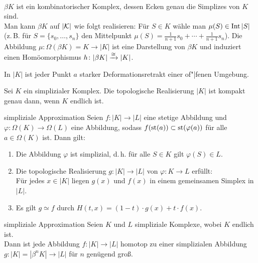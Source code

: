 \begin{Bem}\\
    $\beta K$ ist ein kombinatorischer Komplex, dessen Ecken genau die
    Simplizes von $K$ sind. \\
    Man kann $\beta K$ auf $|\mathcal{K}|$ wie folgt realisieren:
    Für $S \in K$ wähle man $\mu(S) \in \operatorname{Int} |S|$
    (z.\,B. für $S = \{s_0, \dotsc, s_n\}$ den Mittelpunkt
    $\mu(S) = \frac{1}{n + 1} s_0 + \dotsb + \frac{1}{n + 1} s_n$).
    Die Abbildung $\mu\colon \Omega(\beta K) = K \rightarrow |K|$ ist
    eine Darstellung von $\beta K$ und induziert einen Homöomorphismus
    $h\colon |\beta K| \xrightarrow{\cong} |K|$.
\end{Bem}

\begin{Kor}
    In $|K|$ ist jeder Punkt $a$ starker Deformationsretrakt einer of"|fenen
    Umgebung.
\end{Kor}

\begin{Kor}
    Sei $K$ ein simplizialer Komplex.
    Die topologische Realisierung $|K|$ ist kompakt genau dann, wenn
    $K$ endlich ist.
\end{Kor}

\linie

\begin{Lemma}{simpliziale Approximation}
    Seien $f\colon |K| \rightarrow |L|$ eine stetige Abbildung und \\
    $\varphi\colon \Omega(K) \rightarrow \Omega(L)$ eine Abbildung,
    sodass $f(\operatorname{st}(a)) \subset \operatorname{st}(\varphi(a))$ für alle $a \in \Omega(K)$ ist.
    Dann gilt:
    \begin{enumerate}
        \item
        Die Abbildung $\varphi$ ist simplizial, d.\,h.
        für alle $S \in K$ gilt $\varphi(S) \in L$.
        
        \item
        Die topologische Realisierung $g\colon |K| \rightarrow |L|$ von
        $\varphi\colon K \rightarrow L$ erfüllt: \\
        Für jedes $x \in |K|$ liegen $g(x)$ und $f(x)$ in einem gemeinsamen
        Simplex in $|L|$.
        
        \item
        Es gilt $g \simeq f$ durch
        $H(t, x) = (1 - t) \cdot g(x) + t \cdot f(x)$.
    \end{enumerate}
\end{Lemma}

\begin{Satz}{simpliziale Approximation}
    Seien $K$ und $L$ simpliziale Komplexe, wobei $K$ endlich ist. \\
    Dann ist jede Abbildung $f\colon |K| \rightarrow |L|$ homotop zu einer
    simplizialen Abbildung \\
    $g\colon |K| = |\beta^n K| \rightarrow |L|$ für $n$ genügend groß.
\end{Satz}

